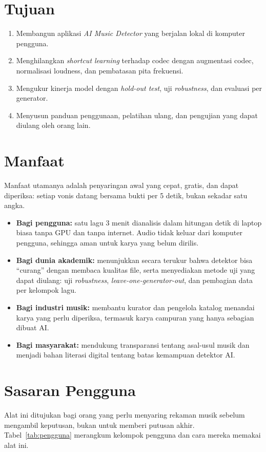 \section{Tujuan}
\begin{enumerate}
\item Membangun aplikasi \textit{AI Music Detector} yang berjalan lokal di komputer pengguna.
\item Menghilangkan \textit{shortcut learning} terhadap codec dengan augmentasi codec, normalisasi loudness, dan pembatasan pita frekuensi.
\item Mengukur kinerja model dengan \textit{hold-out test}, uji \textit{robustness}, dan evaluasi per generator.
\item Menyusun panduan penggunaan, pelatihan ulang, dan pengujian yang dapat diulang oleh orang lain.
\end{enumerate}

\section{Manfaat}
Manfaat utamanya adalah penyaringan awal yang cepat, gratis, dan dapat diperiksa: setiap vonis datang bersama bukti per 5 detik, bukan sekadar satu angka.
\begin{itemize}
\item \textbf{Bagi pengguna:} satu lagu 3 menit dianalisis dalam hitungan detik di laptop biasa tanpa GPU dan tanpa internet. Audio tidak keluar dari komputer pengguna, sehingga aman untuk karya yang belum dirilis.
\item \textbf{Bagi dunia akademik:} menunjukkan secara terukur bahwa detektor bisa ``curang'' dengan membaca kualitas file, serta menyediakan metode uji yang dapat diulang: uji \textit{robustness}, \textit{leave-one-generator-out}, dan pembagian data per kelompok lagu.
\item \textbf{Bagi industri musik:} membantu kurator dan pengelola katalog menandai karya yang perlu diperiksa, termasuk karya campuran yang hanya sebagian dibuat AI.
\item \textbf{Bagi masyarakat:} mendukung transparansi tentang asal-usul musik dan menjadi bahan literasi digital tentang batas kemampuan detektor AI.
\end{itemize}

\section{Sasaran Pengguna}
Alat ini ditujukan bagi orang yang perlu menyaring rekaman musik sebelum mengambil keputusan, bukan untuk memberi putusan akhir. Tabel~\ref{tab:pengguna} merangkum kelompok pengguna dan cara mereka memakai alat ini.

